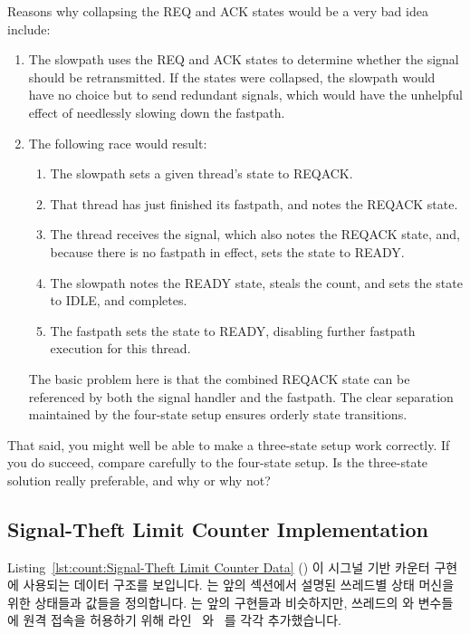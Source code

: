 {{	Reasons why collapsing the REQ and ACK states would be a very
	bad idea include:
	\begin{enumerate}
	\item	The slowpath uses the REQ and ACK states to determine
		whether the signal should be retransmitted.
		If the states were collapsed, the slowpath would have
		no choice but to send redundant signals, which would
		have the unhelpful effect of needlessly slowing down
		the fastpath.
	\item	The following race would result:
		\begin{enumerate}
		\item	The slowpath sets a given thread's state to REQACK.
		\item	That thread has just finished its fastpath, and
			notes the REQACK state.
		\item	The thread receives the signal, which also notes
			the REQACK state, and, because there is no fastpath
			in effect, sets the state to READY\@.
		\item	The slowpath notes the READY state, steals the
			count, and sets the state to IDLE, and completes.
		\item	The fastpath sets the state to READY, disabling
			further fastpath execution for this thread.
		\end{enumerate}
		The basic problem here is that the combined REQACK state
		can be referenced by both the signal handler and the
		fastpath.
		The clear separation maintained by the four-state
		setup ensures orderly state transitions.
	\end{enumerate}
	That said, you might well be able to make a three-state setup
	work correctly.
	If you do succeed, compare carefully to the four-state setup.
	Is the three-state solution really preferable, and why or why not?

	\fi

}\QuickQuizEndE
}

\subsection{Signal-Theft Limit Counter Implementation}
\label{sec:count:Signal-Theft Limit Counter Implementation}

\begin{fcvref}
Listing~\ref{lst:count:Signal-Theft Limit Counter Data}
()
이 시그널 기반 카운터 구현에 사용되는 데이터 구조를 보입니다.
 는 앞의 섹션에서 설명된 쓰레드별 상태 머신을
위한 상태들과 값들을 정의합니다.
 는 앞의 구현들과 비슷하지만, 쓰레드의
 와  변수들에 원격 접속을 허용하기 위해
라인~ 와~ 를 각각 추가했습니다.
\end{fcvref}

